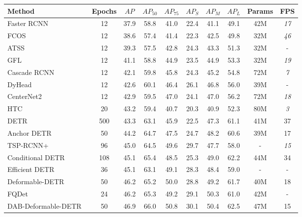 \documentclass[10pt,twocolumn,letterpaper]{article}
\begin{document}
\begin{table*}[ht]
\centering
\begin{tabular}{@{}l@{\ }c@{\ \ \ \ }c@{\ \ \ \ }c@{\ \ \ \ }c@{\ \ \ \ }c@{\ \ \ \ }c@{\ \ \ \ }c@{\ \ \ }c@{\ \ \ }c@{}}
\toprule
Method       & Epochs & $AP$  & $AP_{50}$ & $AP_{75}$ & $AP_S$ & $AP_M$ & $AP_L$ & Params & FPS \\
\midrule
Faster RCNN~\cite{ren2015faster} & 12 & 37.9 & 58.8 & 41.0 & 22.4 & 41.1& 49.1 & 42M & \textit{17} \\
FCOS~\cite{tian2019fcos} & 12 & 38.6 & 57.4 & 41.4 & 22.3 & 42.5 & 49.8 & 32M & \textit{46} \\
ATSS~\cite{zhang2020bridging} & 12 & 39.3 & 57.5 & 42.8 & 24.3 & 43.3 & 51.3 & 32M & - \\  GFL~\cite{li2020generalizedv2} & 12 & 41.1 & 58.8 & 44.9 & 23.5 & 44.9 & 53.3 & 32M & \textit{19} \\
Cascade RCNN~\cite{cai2018cascade} & 12 & 42.1 & 59.8 & 45.8 & 24.3 & 45.2 & 54.8 & 72M & \textit{7} \\
DyHead~\cite{dai2021dynamic} & 12 & 42.6 & 60.1 & 46.4 & 26.1 & 46.8 & 56.0 & 39M & -\\
CenterNet2~\cite{zhou2021probablistic} & 12 & 42.9 &  59.5 & 47.0 & 24.1 & 47.0 & 56.2 & 72M & \textit{18} \\
HTC~\cite{chen2019hybrid} & 20 & 43.2 & 59.4 & 40.7 & 20.3 & 40.9 & 52.3 & 80M & \textit{3} \\
\midrule
DETR~\cite{carion2020end} & 500 & 43.3 & 63.1 & 45.9 & 22.5 & 47.3 & 61.1 & 41M & 37\\
Anchor DETR~\cite{wang2021anchor} & 50 & 44.2 & 64.7 & 47.5 & 24.7 & 48.2 & 60.6 & 39M & 17 \\
TSP-RCNN+~\cite{sun2020rethinking} & 96 & 45.0 & 64.5 & 49.6 & 29.7 & 47.7 & 58.0 & - & \textit{15} \\
Conditional DETR~\cite{meng2021conditional} & 108 & 45.1 & 65.4 & 48.5 & 25.3 & 49.0 & 62.2 & 44M & 34 \\
Efficient DETR~\cite{yao2021efficient} & 36 & 45.1 & 63.1 & 49.1 & 28.3 & 48.4 & 59.0 & - & -\\
Deformable-DETR~\cite{zhu2020deformable} & 50 & 46.2 & 65.2 & 50.0 & 28.8 & 49.2 & 61.7 & 40M & 18 \\
FQDet~\cite{picron2022fqdet} & 24 & 46.2 & 65.3 & 49.2 & 29.1 & 50.3 & 61.0 & 42M & - \\
DAB-Deformable-DETR~\cite{liu2022dab} & 50 & 46.9 & 66.0 & 50.8 & 30.1 & 50.4 & 62.5 & 47M & 15 \\

\end{tabular}
\end{table*}
\end{document}
